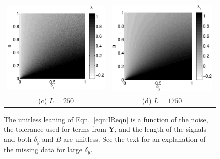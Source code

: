 \documentclass[twocolumn,aps,pre,groupedaddress]{revtex4-1}
\begin{document}
\begin{figure}[ht]
\begin{tabular}{cc}
\includegraphics[scale=0.30]{SimpleIRexample_diffLpart3.eps} &
\includegraphics[scale=0.30]{SimpleIRexample_diffLpart4.eps} \\
(c) $L=250$ & (d) $L=1750$ \\
\end{tabular}
\caption{The unitless leaning of Eqn.\ \ref{eqn:IReqn} is a function of the noise, the tolerance used for terms from $\mathbf{Y}$, and the length of the signals and both $\delta_y$ and $B$ are unitless.  See the text for an explanation of the missing data for large $\delta_y$.}
\label{fig:IRexChangeL}
\end{figure}
\end{document}
